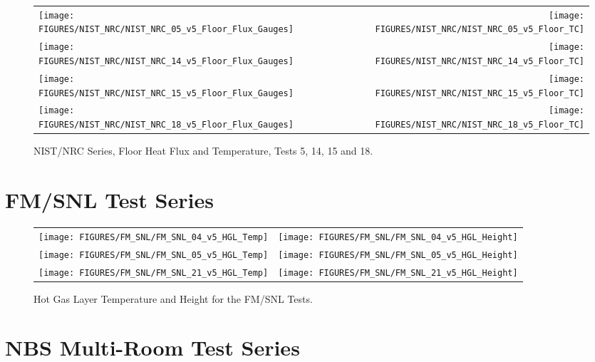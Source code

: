 \begin{figure}[p]
\begin{tabular*}{\textwidth}{l@{\extracolsep{\fill}}r}
\texttt{[image: FIGURES/NIST\_NRC/NIST\_NRC\_05\_v5\_Floor\_Flux\_Gauges]} &
\texttt{[image: FIGURES/NIST\_NRC/NIST\_NRC\_05\_v5\_Floor\_TC]} \\
\texttt{[image: FIGURES/NIST\_NRC/NIST\_NRC\_14\_v5\_Floor\_Flux\_Gauges]} &
\texttt{[image: FIGURES/NIST\_NRC/NIST\_NRC\_14\_v5\_Floor\_TC]} \\
\texttt{[image: FIGURES/NIST\_NRC/NIST\_NRC\_15\_v5\_Floor\_Flux\_Gauges]} &
\texttt{[image: FIGURES/NIST\_NRC/NIST\_NRC\_15\_v5\_Floor\_TC]} \\
\texttt{[image: FIGURES/NIST\_NRC/NIST\_NRC\_18\_v5\_Floor\_Flux\_Gauges]} &
\texttt{[image: FIGURES/NIST\_NRC/NIST\_NRC\_18\_v5\_Floor\_TC]}
\end{tabular*}
\caption{NIST/NRC Series, Floor Heat Flux and Temperature, Tests 5, 14, 15 and 18.}
\label{NIST_NRC_Floor_4}
\end{figure}


\clearpage



\section{FM/SNL Test Series}\label{sec:FM_SNL_Graphs}

\begin{figure}[p]
\begin{tabular*}{\textwidth}{l@{\extracolsep{\fill}}r}
\texttt{[image: FIGURES/FM\_SNL/FM\_SNL\_04\_v5\_HGL\_Temp]} &
\texttt{[image: FIGURES/FM\_SNL/FM\_SNL\_04\_v5\_HGL\_Height]} \\
\texttt{[image: FIGURES/FM\_SNL/FM\_SNL\_05\_v5\_HGL\_Temp]} &
\texttt{[image: FIGURES/FM\_SNL/FM\_SNL\_05\_v5\_HGL\_Height]} \\
\texttt{[image: FIGURES/FM\_SNL/FM\_SNL\_21\_v5\_HGL\_Temp]} &
\texttt{[image: FIGURES/FM\_SNL/FM\_SNL\_21\_v5\_HGL\_Height]}
\end{tabular*}
\caption{Hot Gas Layer Temperature and Height for the FM/SNL Tests.} \label{FM_SNL_HGL}
\end{figure}

\clearpage

\section{NBS Multi-Room Test Series}\label{sec:NBS_Graphs}

